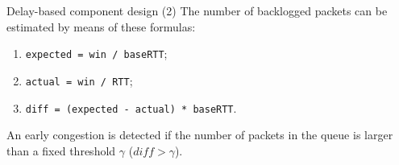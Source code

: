 \begin{frame}{Delay-based component design (2)}
        The number of backlogged packets can
	be estimated by means of these formulas:
		\begin{enumerate}
			\item \texttt{expected = win / baseRTT};
			\item \texttt{actual = win / RTT};
			\item \texttt{diff = (expected - actual) * baseRTT}.
		\end{enumerate}
	An early congestion is detected if the number of packets in the queue is larger
	than a fixed threshold $\gamma$ ($diff > \gamma$).
\end{frame}

